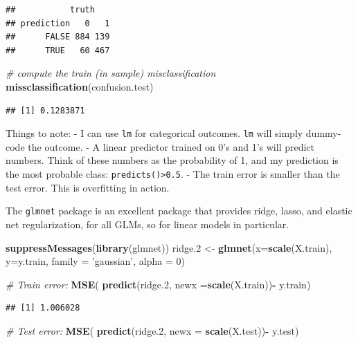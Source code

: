 \documentclass[]{book}
\newenvironment{Shaded}{\begin{snugshade}}{\end{snugshade}}
\newcommand{\KeywordTok}[1]{\textcolor[rgb]{0.13,0.29,0.53}{\textbf{#1}}}
\newcommand{\DataTypeTok}[1]{\textcolor[rgb]{0.13,0.29,0.53}{#1}}
\newcommand{\DecValTok}[1]{\textcolor[rgb]{0.00,0.00,0.81}{#1}}
\newcommand{\StringTok}[1]{\textcolor[rgb]{0.31,0.60,0.02}{#1}}
\newcommand{\CommentTok}[1]{\textcolor[rgb]{0.56,0.35,0.01}{\textit{#1}}}
\newcommand{\OperatorTok}[1]{\textcolor[rgb]{0.81,0.36,0.00}{\textbf{#1}}}
\newcommand{\NormalTok}[1]{#1}
\theoremstyle{definition}
\theoremstyle{definition}
\theoremstyle{definition}
\theoremstyle{remark}
\begin{document}
\begin{verbatim}
##           truth
## prediction   0   1
##      FALSE 884 139
##      TRUE   60 467
\end{verbatim}

\begin{Shaded}
\begin{Highlighting}[]
\CommentTok{# compute the train (in sample) misclassification}
\KeywordTok{missclassification}\NormalTok{(confusion.test)}
\end{Highlighting}
\end{Shaded}

\begin{verbatim}
## [1] 0.1283871
\end{verbatim}

Things to note: - I can use \texttt{lm} for categorical outcomes.
\texttt{lm} will simply dummy-code the outcome. - A linear predictor
trained on 0's and 1's will predict numbers. Think of these numbers as
the probability of 1, and my prediction is the most probable class:
\texttt{predicts()\textgreater{}0.5}. - The train error is smaller than
the test error. This is overfitting in action.

The \texttt{glmnet} package is an excellent package that provides ridge,
lasso, and elastic net regularization, for all GLMs, so for linear
models in particular.

\begin{Shaded}
\begin{Highlighting}[]
\KeywordTok{suppressMessages}\NormalTok{(}\KeywordTok{library}\NormalTok{(glmnet))}
\NormalTok{ridge.}\DecValTok{2}\NormalTok{ <-}\StringTok{ }\KeywordTok{glmnet}\NormalTok{(}\DataTypeTok{x=}\KeywordTok{scale}\NormalTok{(X.train), }\DataTypeTok{y=}\NormalTok{y.train, }\DataTypeTok{family =} \StringTok{'gaussian'}\NormalTok{, }\DataTypeTok{alpha =} \DecValTok{0}\NormalTok{)}

\CommentTok{# Train error:}
\KeywordTok{MSE}\NormalTok{( }\KeywordTok{predict}\NormalTok{(ridge.}\DecValTok{2}\NormalTok{, }\DataTypeTok{newx =}\KeywordTok{scale}\NormalTok{(X.train))}\OperatorTok{-}\StringTok{ }\NormalTok{y.train)}
\end{Highlighting}
\end{Shaded}

\begin{verbatim}
## [1] 1.006028
\end{verbatim}

\begin{Shaded}
\begin{Highlighting}[]
\CommentTok{# Test error:}
\KeywordTok{MSE}\NormalTok{( }\KeywordTok{predict}\NormalTok{(ridge.}\DecValTok{2}\NormalTok{, }\DataTypeTok{newx =} \KeywordTok{scale}\NormalTok{(X.test))}\OperatorTok{-}\StringTok{ }\NormalTok{y.test)}
\end{Highlighting}
\end{Shaded}
\end{document}
